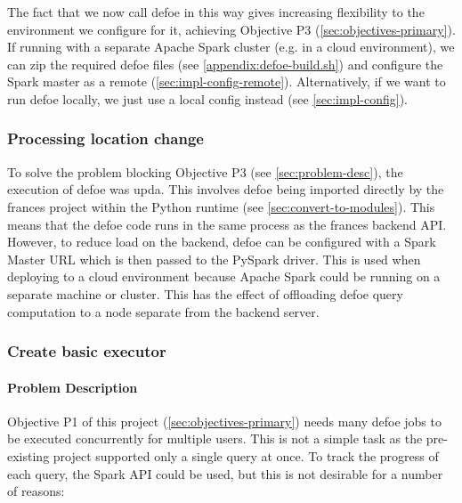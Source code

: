 \documentclass[12pt, letterpaper]{article}
\begin{document}
\begin{flushleft}
The fact that we now call defoe in this way gives increasing flexibility to the environment we configure for it, achieving Objective P3 (\ref{sec:objectives-primary}). If running with a separate Apache Spark cluster (e.g. in a cloud environment), we can zip the required  defoe files (see \ref{appendix:defoe-build.sh}) and configure the Spark master as a remote (\ref{sec:impl-config-remote}). Alternatively, if we want to run defoe locally, we just use a local config instead (see \ref{sec:impl-config}).
\end{flushleft}

\subsubsection{Processing location change}\label{sec:impl-defoe-location}

\begin{flushleft}
To solve the problem blocking Objective P3 (see \ref{sec:problem-desc}), the execution of defoe was upda. This involves defoe being imported directly by the frances project within the Python runtime (see \ref{sec:convert-to-modules}). This means that the defoe code runs in the same process as the frances backend API. However, to reduce load on the backend, defoe can be configured with a Spark Master URL which is then passed to the PySpark driver. This is used when deploying to a cloud environment because Apache Spark could be running on a separate machine or cluster. This has the effect of offloading defoe query computation to a node separate from the backend server.
\end{flushleft}

\subsubsection{Create basic executor}\label{sec:impl-executor}

\paragraph{Problem Description}\label{sec:executor-problem-desc}

\begin{flushleft}
Objective P1 of this project (\ref{sec:objectives-primary}) needs many defoe jobs to be executed concurrently for multiple users. This is not a simple task as the pre-existing project supported only a single query at once. To track the progress of each query, the Spark API could be used, but this is not desirable for a number of reasons:
\end{flushleft}
\end{document}
